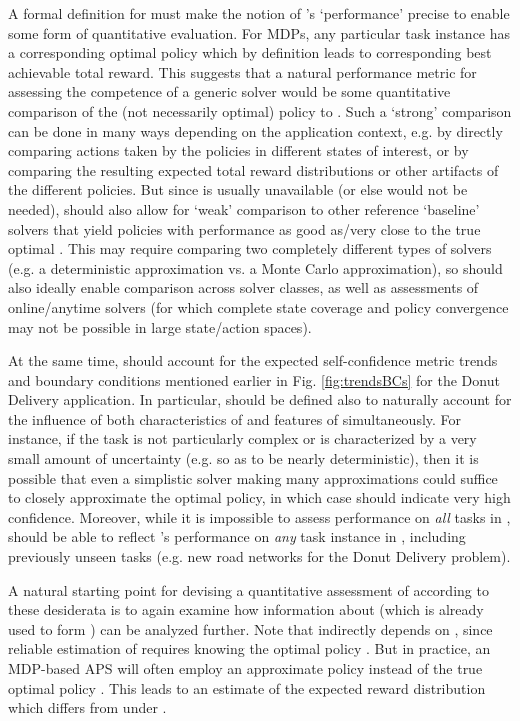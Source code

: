 A formal definition for \xQ{} must make the notion of \solve{}'s `performance' precise to enable some form of quantitative evaluation. For MDPs, any particular task instance \task{} has a corresponding optimal policy \piopt{} which by definition leads to corresponding best achievable total reward. This suggests that a natural performance metric for assessing the competence of a generic solver \solve{} would be some quantitative comparison of the (not necessarily optimal) policy \pigeneric{} to \piopt. Such a `strong' comparison can be done in many ways depending on the application context, e.g. by directly comparing actions taken by the policies in different states of interest, or by comparing the resulting expected total reward distributions or other artifacts of the different policies. 
But since \piopt{} is usually unavailable (or else \solve{} would not be needed), \xQ{} should also allow for `weak' comparison to other reference `baseline' solvers that yield policies with performance as good as/very close to the true optimal \piopt. This may require comparing two completely different types of solvers (e.g. a deterministic approximation vs. a Monte Carlo approximation), so \xQ{} should also ideally enable comparison across solver classes, as well as assessments of online/anytime solvers (for which complete state coverage and policy convergence may not be possible in large state/action spaces).
 
At the same time, \xQ{} should account for the expected self-confidence metric trends and boundary conditions mentioned earlier in Fig. \ref{fig:trendsBCs} for the Donut Delivery application. In particular, \xQ{} should be defined also to naturally account for the influence of both characteristics of \solve{} and features of \task{} simultaneously. For instance, if the task \task{} is not particularly complex or is characterized by a very small amount of uncertainty (e.g. so as to be nearly deterministic), then it is possible that even a simplistic solver making many approximations could suffice to closely approximate the optimal policy, in which case \xQ{} should indicate very high confidence. Moreover, while it is impossible to assess performance on \emph{all} tasks in \taskclass{}, \xQ{} should be able to reflect \solve{}'s performance on \emph{any} task instance \task{} in \taskclass{}, including previously unseen tasks (e.g. new road networks for the Donut Delivery problem). 

A natural starting point for devising a quantitative assessment of \xQ{} according to these desiderata is to again examine how information about \rwdapprox{} (which is already used to form \xO{}) can be analyzed further. 
Note that \xO{} indirectly depends on \xQ{}, since reliable estimation of \rwdoptapprox{} requires knowing the optimal policy \piopt. But in practice, an MDP-based APS will often employ an approximate policy \piapprox{} instead of the true optimal policy \piopt. This leads to an estimate \rwdapprox{} of the expected reward distribution which differs from \rwdopt{} under \piopt.


